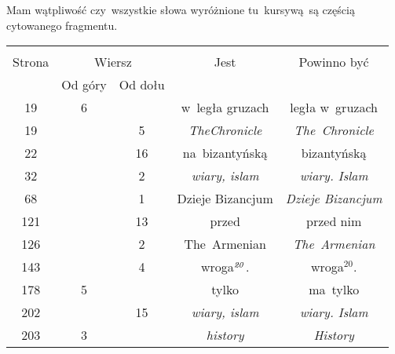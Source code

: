 \documentclass[a4paper,11pt]{article}
\begin{document}

\start {} Mam wątpliwość czy~wszystkie słowa wyróżnione
tu~kursywą~są częścią cytowanego fragmentu.



\begin{center}
  \begin{tabular}{|c|c|c|c|c|}
    \hline
    & \multicolumn{2}{c|}{} & & \\
    Strona & \multicolumn{2}{c|}{Wiersz} & Jest
                              & Powinno być \\ \cline{2-3}
    & Od góry & Od dołu & & \\
    \hline
    19  &  6 & & w~legła gruzach & legła w~gruzach \\
    19  & &  5 & \emph{TheChronicle} & \emph{The~Chronicle} \\
    22  & & 16 & na~bizantyńską & bizantyńską \\
    32  & &  2 & \emph{wiary, islam} & \emph{wiary. Islam} \\
    68  & &  1 & Dzieje Bizancjum & \emph{Dzieje Bizancjum} \\
    121 & & 13 & przed & przed nim \\
    126 & &  2 & The~Armenian & \emph{The~Armenian} \\
    143 & &  4 & wroga$^{ \textrm{\emph{20}} }$. & wroga$^{ 20 }$. \\
    178 &  5 & & tylko & ma~tylko \\
    202 & & 15 & \emph{wiary, islam} & \emph{wiary. Islam} \\
    203 &  3 & & \emph{history} & \emph{History} \\
    \hline
  \end{tabular}
\end{center}

\vspace{\spaceTwo}








\end{document}

